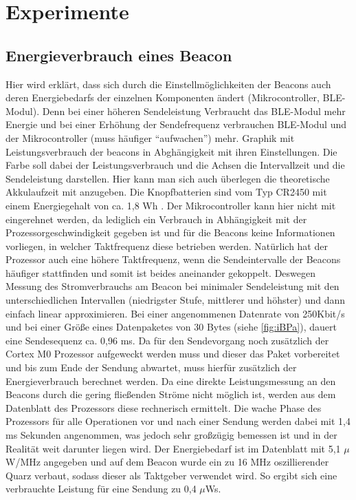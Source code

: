 \section{Experimente}
\subsection{Energieverbrauch eines Beacon}
Hier wird erklärt, dass sich durch die Einstellmöglichkeiten der Beacons auch deren Energiebedarfs der einzelnen Komponenten ändert (Mikrocontroller, BLE-Modul). Denn bei einer höheren Sendeleistung Verbraucht das BLE-Modul mehr Energie und bei einer Erhöhung der Sendefrequenz verbrauchen BLE-Modul und der Mikrocontroller (muss häufiger "`aufwachen"') mehr. 
Graphik mit Leistungsverbrauch der beacons in Abghängigkeit mit ihren Einstellungen. Die Farbe soll dabei der Leistungsverbrauch und die Achsen die Intervallzeit und die Sendeleistung darstellen. Hier kann man sich auch überlegen die theoretische Akkulaufzeit mit anzugeben. Die Knopfbatterien sind vom Typ CR2450 mit einem Energiegehalt von ca. 1,8 Wh \cite{CR2450}. Der Mikrocontroller kann hier nicht mit eingerehnet werden, da lediglich ein Verbrauch in Abhängigkeit mit der Prozessorgeschwindigkeit \cite{ARM} gegeben ist und für die Beacons keine Informationen vorliegen, in welcher Taktfrequenz diese betrieben werden. Natürlich hat der Prozessor auch eine höhere Taktfrequenz, wenn die Sendeintervalle der Beacons häufiger stattfinden und somit ist beides aneinander gekoppelt. Deswegen Messung des Stromverbrauchs am Beacon bei minimaler Sendeleistung mit den unterschiedlichen Intervallen (niedrigster Stufe, mittlerer und höhster) und dann einfach linear approximieren.
Bei einer angenommenen Datenrate von 250Kbit/s \cite{nRF5} und bei einer Größe eines Datenpaketes von 30 Bytes \cite{iBPa} (siehe \ref{fig:iBPa}), dauert eine Sendesequenz ca. 0,96 ms. Da für den Sendevorgang noch zusätzlich der Cortex M0 Prozessor aufgeweckt werden muss und dieser das Paket vorbereitet und bis zum Ende der Sendung abwartet, muss hierfür zusätzlich der Energieverbrauch berechnet werden. Da eine direkte Leistungsmessung an den Beacons durch die gering fließenden Ströme nicht möglich ist, werden aus dem Datenblatt des Prozessors diese rechnerisch ermittelt. Die wache Phase des Prozessors für alle Operationen vor und nach einer Sendung werden dabei mit 1,4 ms Sekunden angenommen, was jedoch sehr großzügig bemessen ist und in der Realität weit darunter liegen wird. Der Energiebedarf ist im Datenblatt mit 5,1 $\mu$W/MHz angegeben und auf dem Beacon wurde ein zu 16 MHz oszillierender Quarz verbaut, sodass dieser als Taktgeber verwendet wird. So ergibt sich eine verbrauchte Leistung für eine Sendung zu 0,4 $\mu$Ws.
